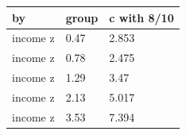 \begingroup\small
\setlength{\tabcolsep}{3pt}
\renewcommand{\arraystretch}{1.04}
\begin{tabularx}{\linewidth}{XXX}
\toprule
by & group & c with 8/10 \\
\midrule
income z & 0.47 & 2.853 \\
income z & 0.78 & 2.475 \\
income z & 1.29 & 3.47 \\
income z & 2.13 & 5.017 \\
income z & 3.53 & 7.394 \\
\bottomrule
\end{tabularx}
\endgroup
